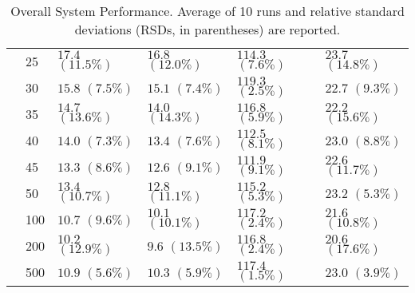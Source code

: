 \begin{table}[ht]
{\begin{tabular}{|P{3.5em}|P{1.8em}|P{5em}|P{5em}|P{5em}|P{5em}|}
&25	&$17.4$ $(11.5\%)$	&$16.8$ $(12.0\%)$	&$114.3$ $(7.6\%)$	&$23.7$ $(14.8\%)$\\
&30	&$15.8$ $(7.5\%)$	&$15.1$ $(7.4\%)$	&$119.3$ $(2.5\%)$	&$22.7$ $(9.3\%)$\\
&35	&$14.7$ $(13.6\%)$	&$14.0$ $(14.3\%)$	&$116.8$ $(5.9\%)$	&$22.2$ $(15.6\%)$\\
&40	&$14.0$ $(7.3\%)$	&$13.4$ $(7.6\%)$	&$112.5$ $(8.1\%)$	&$23.0$ $(8.8\%)$\\
&45	&$13.3$ $(8.6\%)$	&$12.6$ $(9.1\%)$	&$111.9$ $(9.1\%)$	&$22.6$ $(11.7\%)$\\
&50	&$13.4$ $(10.7\%)$	&$12.8$ $(11.1\%)$	&$115.2$ $(5.3\%)$	&$23.2$ $(5.3\%)$\\
&100	&$10.7$ $(9.6\%)$	&$10.1$ $(10.1\%)$	&$117.2$ $(2.4\%)$	&$21.6$ $(10.8\%)$\\
&200	&$10.2$ $(12.9\%)$	&$9.6$ $(13.5\%)$	&$116.8$ $(2.4\%)$	&$20.6$ $(17.6\%)$\\
&500	&$10.9$ $(5.6\%)$	&$10.3$ $(5.9\%)$	&$117.4$ $(1.5\%)$	&$23.0$ $(3.9\%)$\\
\end{tabular}
}
\caption{ Overall System Performance. Average of 10 runs and relative standard deviations (RSDs, in parentheses) are reported. 
}
\label{tab:all}
\end{table}





